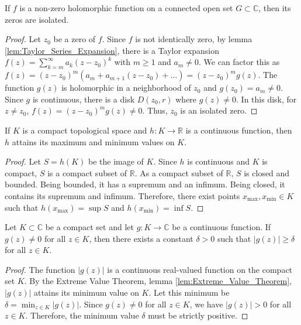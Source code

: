 \begin{lemma}
    \label{lem:Isolation_of_Zeros}
    If $f$ is a non-zero holomorphic function on a connected open set $G \subset \mathbb{C}$, then its zeros are isolated.
\end{lemma}

\begin{proof}
    Let $z_0$ be a zero of $f$. Since $f$ is not identically zero, by lemma \ref{lem:Taylor_Series_Expansion}, there is a Taylor expansion $f(z) = \sum_{k=m}^\infty a_k (z-z_0)^k$ with $m \ge 1$ and $a_m \neq 0$. We can factor this as $f(z) = (z-z_0)^m \left(a_m + a_{m+1}(z-z_0) + \dots\right) = (z-z_0)^m g(z)$. The function $g(z)$ is holomorphic in a neighborhood of $z_0$ and $g(z_0) = a_m \neq 0$. Since $g$ is continuous, there is a disk $D(z_0, r)$ where $g(z) \neq 0$. In this disk, for $z \neq z_0$, $f(z) = (z-z_0)^m g(z) \neq 0$. Thus, $z_0$ is an isolated zero.
\end{proof}

\begin{lemma}
    \label{lem:Extreme_Value_Theorem}
    If $K$ is a compact topological space and $h: K \to \mathbb{R}$ is a continuous function, then $h$ attains its maximum and minimum values on $K$.
\end{lemma}

\begin{proof}
    Let $S = h(K)$ be the image of $K$. Since $h$ is continuous and $K$ is compact, $S$ is a compact subset of $\mathbb{R}$. As a compact subset of $\mathbb{R}$, $S$ is closed and bounded. Being bounded, it has a supremum and an infimum. Being closed, it contains its supremum and infimum. Therefore, there exist points $x_{\mathrm{max}}, x_{\mathrm{min}} \in K$ such that $h(x_{\mathrm{max}}) = \sup S$ and $h(x_{\mathrm{min}}) = \inf S$.
\end{proof}

\begin{lemma}
    \label{lem:Minimum_Modulus_on_Compact_Set}
    Let $K \subset \mathbb{C}$ be a compact set and let $g: K \to \mathbb{C}$ be a continuous function. If $g(z) \neq 0$ for all $z \in K$, then there exists a constant $\delta > 0$ such that $|g(z)| \ge \delta$ for all $z \in K$.
\end{lemma}

\begin{proof}
    The function $|g(z)|$ is a continuous real-valued function on the compact set $K$. By the Extreme Value Theorem, lemma \ref{lem:Extreme_Value_Theorem}, $|g(z)|$ attains its minimum value on $K$. Let this minimum be $\delta = \min_{z \in K} |g(z)|$. Since $g(z) \neq 0$ for all $z \in K$, we have $|g(z)| > 0$ for all $z \in K$. Therefore, the minimum value $\delta$ must be strictly positive.
\end{proof}

